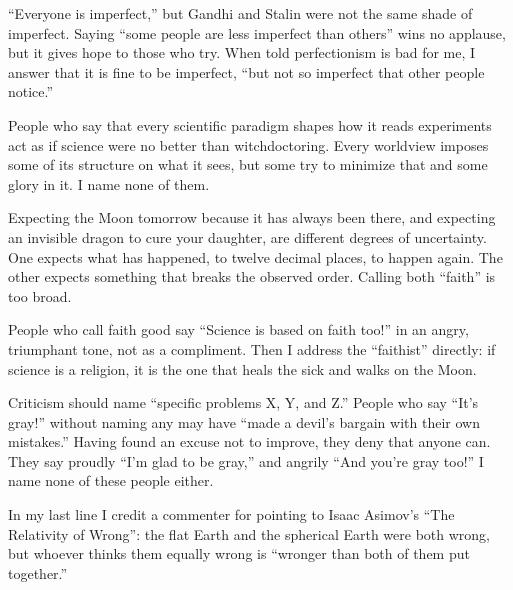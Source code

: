 ``Everyone is imperfect,'' but Gandhi and Stalin were not the same shade of imperfect. Saying ``some people are less imperfect than others'' wins no applause, but it gives hope to those who try. When told perfectionism is bad for me, I answer that it is fine to be imperfect, ``but not so imperfect that other people notice.''

People who say that every scientific paradigm shapes how it reads experiments act as if science were no better than witchdoctoring. Every worldview imposes some of its structure on what it sees, but some try to minimize that and some glory in it. I name none of them.

Expecting the Moon tomorrow because it has always been there, and expecting an invisible dragon to cure your daughter, are different degrees of uncertainty. One expects what has happened, to twelve decimal places, to happen again. The other expects something that breaks the observed order. Calling both ``faith'' is too broad. 

People who call faith good say ``Science is based on faith too!'' in an angry, triumphant tone, not as a compliment. Then I address the ``faithist'' directly: if science is a religion, it is the one that heals the sick and walks on the Moon. 

Criticism should name ``specific problems X, Y, and Z.'' People who say ``It's gray!'' without naming any may have ``made a devil's bargain with their own mistakes.'' Having found an excuse not to improve, they deny that anyone can. They say proudly ``I'm glad to be gray,'' and angrily ``And you're gray too!'' I name none of these people either.

In my last line I credit a commenter for pointing to Isaac Asimov's ``The Relativity of Wrong'': the flat Earth and the spherical Earth were both wrong, but whoever thinks them equally wrong is ``wronger than both of them put together.'' 
